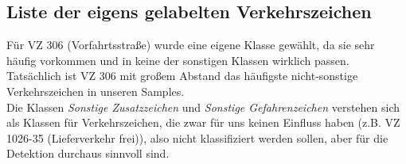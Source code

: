 \begin{appendix}
\section{Liste der eigens gelabelten Verkehrszeichen}
\label{sec:eigens_gelabelte_verkehrszeichen}

Für \gls{VZ} 306 (Vorfahrtsstraße) wurde eine eigene Klasse gewählt, da sie sehr häufig vorkommen und in keine der sonstigen Klassen wirklich passen. Tatsächlich ist \gls{VZ} 306 mit großem Abstand das häufigste nicht-sonstige Verkehrszeichen in unseren Samples.\\ 
Die Klassen \textit{Sonstige Zusatzzeichen} und \textit{Sonstige Gefahrenzeichen} verstehen sich als Klassen für Verkehrszeichen, die zwar für uns keinen Einfluss haben (z.B. \gls{VZ} 1026-35 (Lieferverkehr frei)), also nicht klassifiziert werden sollen, aber für die Detektion durchaus sinnvoll sind. \\


\end{appendix}
